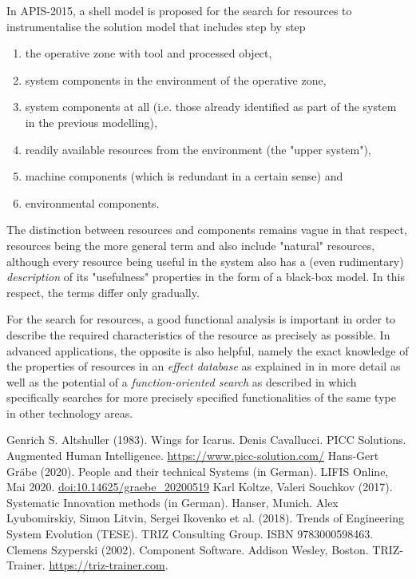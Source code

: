 \documentclass[11pt,a4paper]{article}
\begin{document}
In APIS-2015, a shell model is proposed for the search for resources to
instrumentalise the solution model that includes step by step
\begin{enumerate}[noitemsep]
\item the operative zone with tool and processed object,
\item system components in the environment of the operative zone,
\item system components at all (i.e. those already identified as part of the
  system in the previous modelling),
\item readily available resources from the environment (the "upper system"),
\item machine components (which is redundant in a certain sense) and
\item environmental components.
\end{enumerate}
The distinction between resources and components remains vague in that
respect, resources being the more general term and also include "natural"
resources, although every resource being useful in the system also has a (even
rudimentary) \emph{description} of its "usefulness" properties in the form of
a black-box model. In this respect, the terms differ only gradually.

For the search for resources, a good functional analysis \cite[sec.
  4.4]{Koltze2017} is important in order to describe the required
characteristics of the resource as precisely as possible.  In advanced
applications, the opposite is also helpful, namely the exact knowledge of the
properties of resources in an \emph{effect database} as explained in
\cite[sec.  8.2]{Koltze2017} in more detail as well as the potential of a
\emph{function-oriented search} as described in \cite[sec.  4.14]{Koltze2017}
which specifically searches for more precisely specified functionalities of
the same type in other technology areas.


\begin{thebibliography}{xxx}
 Genrich S. Altshuller (1983). Wings for Icarus.
 Denis Cavallucci. PICC Solutions. Augmented Human
  Intelligence.  \url{https://www.picc-solution.com/}
 Hans-Gert Gräbe (2020). People and their technical
  Systems (in German). LIFIS Online, Mai 2020.
  \url{doi:10.14625/graebe_20200519}
 Karl Koltze, Valeri Souchkov (2017). Systematic
  Innovation methods (in German). Hanser, Munich.
 Alex Lyubomirskiy, Simon Litvin, Sergei Ikovenko et al.
  (2018). Trends of Engineering System Evolution (TESE).  TRIZ Consulting
  Group.  ISBN 9783000598463.
 Clemens Szyperski (2002). Component Software. Addison
  Wesley, Boston. 
 TRIZ-Trainer. \url{https://triz-trainer.com}.
\end{thebibliography}
\end{document}
